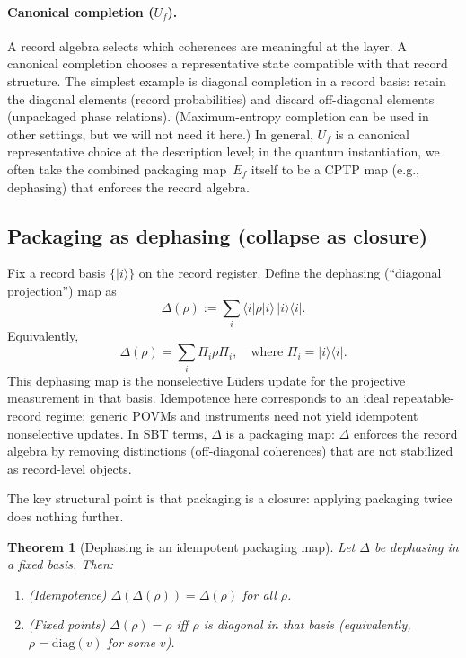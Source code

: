 \documentclass[11pt]{article}
\newtheorem{theorem}{Theorem}
\begin{document}
\paragraph{Canonical completion ($U_f$).}
A record algebra selects which coherences are meaningful at the layer.
A canonical completion chooses a representative state compatible with that record structure.
The simplest example is diagonal completion in a record basis: retain the diagonal elements (record probabilities) and discard off-diagonal elements (unpackaged phase relations).
(Maximum-entropy completion can be used in other settings, but we will not need it here.)
In general, $U_f$ is a canonical representative choice at the description level; in the quantum instantiation, we often take the combined packaging map~$E_f$ itself to be a CPTP map (e.g., dephasing) that enforces the record algebra.

\subsection{Packaging as dephasing (collapse as closure)}

Fix a record basis $\{|i\rangle\}$ on the record register.
Define the dephasing (``diagonal projection'') map as
\[
\Delta(\rho) := \sum_i \langle i|\rho|i\rangle\, |i\rangle\!\langle i|.
\]
Equivalently,
\[
\Delta(\rho)=\sum_i \Pi_i \rho \Pi_i,\quad \text{where } \Pi_i = |i\rangle\!\langle i|.
\]
This dephasing map is the nonselective L\"uders update for the projective measurement in that basis.\cite{NielsenChuang2010QCQI} Idempotence here corresponds to an ideal repeatable-record regime; generic POVMs and instruments need not yield idempotent nonselective updates.
In SBT terms, $\Delta$ is a packaging map: $\Delta$ enforces the record algebra by removing distinctions (off-diagonal coherences) that are not stabilized as record-level objects.

The key structural point is that packaging is a closure: applying packaging twice does nothing further.

\begin{theorem}[Dephasing is an idempotent packaging map]\label{thm:dephase}
Let $\Delta$ be dephasing in a fixed basis.
Then:
\begin{enumerate}
  \item (Idempotence) $\Delta(\Delta(\rho))=\Delta(\rho)$ for all $\rho$.
  \item (Fixed points) $\Delta(\rho)=\rho$ iff $\rho$ is diagonal in that basis (equivalently, $\rho=\mathrm{diag}(v)$ for some $v$).
\end{enumerate}
\end{theorem}
\end{document}
